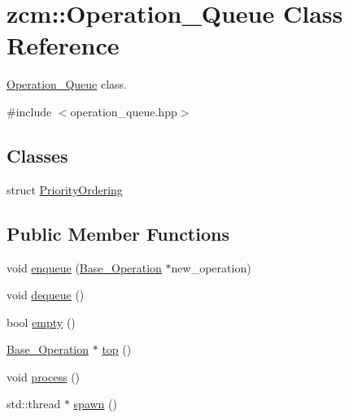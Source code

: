 \hypertarget{classzcm_1_1Operation__Queue}{\section{zcm\-:\-:Operation\-\_\-\-Queue Class Reference}
\label{classzcm_1_1Operation__Queue}
}


\hyperlink{classzcm_1_1Operation__Queue}{Operation\-\_\-\-Queue} class.  




{\ttfamily \#include $<$operation\-\_\-queue.\-hpp$>$}

\subsection*{Classes}
\begin{DoxyCompactItemize}
\item 
struct \hyperlink{structzcm_1_1Operation__Queue_1_1PriorityOrdering}{Priority\-Ordering}
\end{DoxyCompactItemize}
\subsection*{Public Member Functions}
\begin{DoxyCompactItemize}
\item 
void \hyperlink{classzcm_1_1Operation__Queue_a22229dc65dd7a4dafcd9880e467c7259}{enqueue} (\hyperlink{classzcm_1_1Base__Operation}{Base\-\_\-\-Operation} $\ast$new\-\_\-operation)
\item 
void \hyperlink{classzcm_1_1Operation__Queue_a2f2e1d6674f1b148eb75320eca01c4b7}{dequeue} ()
\item 
bool \hyperlink{classzcm_1_1Operation__Queue_aa2ace1c0c0483b01a391e54e31281e1a}{empty} ()
\item 
\hyperlink{classzcm_1_1Base__Operation}{Base\-\_\-\-Operation} $\ast$ \hyperlink{classzcm_1_1Operation__Queue_aca92acffae896456388a6b74c24a1d68}{top} ()
\item 
void \hyperlink{classzcm_1_1Operation__Queue_a7a1b4578e27c24f6ce126cbd9b76e2c8}{process} ()
\item 
std\-::thread $\ast$ \hyperlink{classzcm_1_1Operation__Queue_a7ee35bb38b4c40770043674e61a344e2}{spawn} ()
\end{DoxyCompactItemize}
